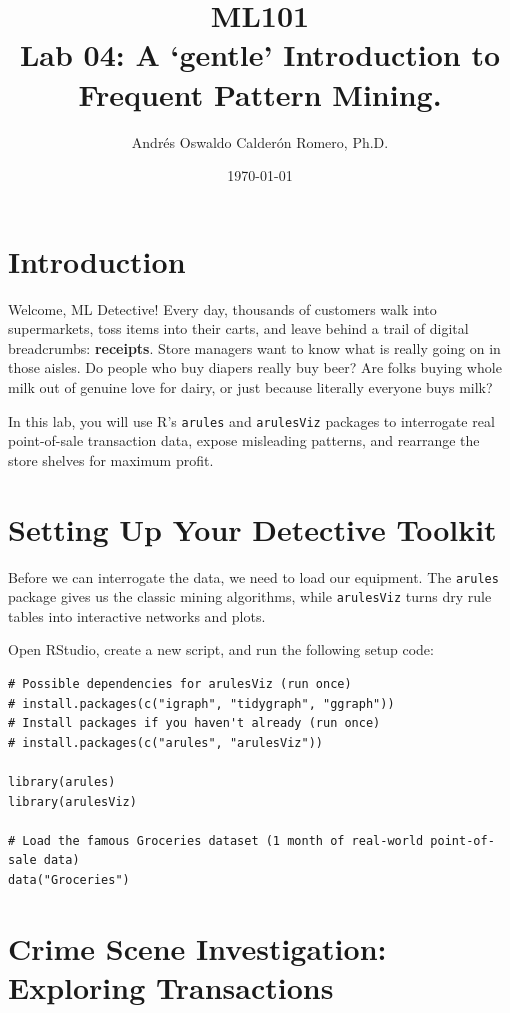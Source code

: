 \documentclass[11pt]{article}
\title{ML101 \\ Lab 04: A `gentle' Introduction to Frequent Pattern Mining.}
\author{Andrés Oswaldo Calderón Romero, Ph.D.}
\date{\today}
\begin{document}
\maketitle

\section{Introduction}
Welcome, ML Detective! Every day, thousands of customers walk into supermarkets, toss items into their carts, and leave behind a trail of digital breadcrumbs: \textbf{receipts}.  Store managers want to know what is really going on in those aisles. Do people who buy diapers really buy beer? Are folks buying whole milk out of genuine love for dairy, or just because literally everyone buys milk?

In this lab, you will use R's \texttt{arules} and \texttt{arulesViz} packages to interrogate real point-of-sale transaction data, expose misleading patterns, and rearrange the store shelves for maximum profit.

\section{Setting Up Your Detective Toolkit}

Before we can interrogate the data, we need to load our equipment. The \texttt{arules} package \cite{hahsler2005arules, hahsler2011arules} gives us the classic mining algorithms, while \texttt{arulesViz} \cite{hahsler2017arulesviz} turns dry rule tables into interactive networks and plots.

Open RStudio, create a new script, and run the following setup code:

\begin{lstlisting}[caption={Installing and loading the required packages.}]
# Possible dependencies for arulesViz (run once)
# install.packages(c("igraph", "tidygraph", "ggraph"))
# Install packages if you haven't already (run once)
# install.packages(c("arules", "arulesViz"))

library(arules)
library(arulesViz)

# Load the famous Groceries dataset (1 month of real-world point-of-sale data)
data("Groceries")
\end{lstlisting}

\section{Crime Scene Investigation: Exploring Transactions}
\end{document}
